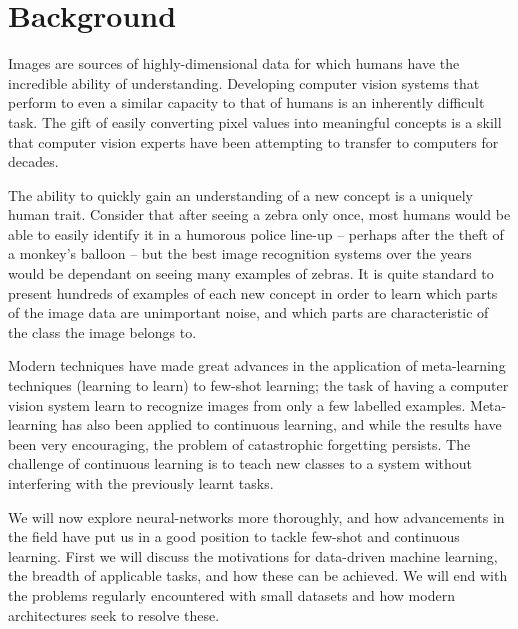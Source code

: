 \documentclass{report}
\begin{document}
\chapter{Background} \label{background:1}
Images are sources of highly-dimensional data for which humans have the incredible ability of understanding. Developing computer vision systems that perform to even a similar capacity to that of humans is an inherently difficult task. The gift of easily converting pixel values into meaningful concepts is a skill that computer vision experts have been attempting to transfer to computers for decades. \par
The ability to quickly gain an understanding of a new concept is a uniquely human trait. Consider that after seeing a zebra only once, most humans would be able to easily identify it in a humorous police line-up  -- perhaps after the theft of a monkey's balloon --  but the best image recognition systems over the years would be dependant on seeing many examples of zebras. It is quite standard to present hundreds of examples of each new concept in order to learn which parts of the image data are unimportant noise, and which parts are characteristic of the class the image belongs to. \par
Modern techniques have made great advances in the application of meta-learning techniques (learning to learn) to few-shot learning; the task of having a computer vision system learn to recognize images from only a few labelled examples. Meta-learning has also been applied to continuous learning, and while the results have been very encouraging, the problem of catastrophic forgetting persists. The challenge of continuous learning is to teach new classes to a system without interfering with the previously learnt tasks. \par
We will now explore neural-networks more thoroughly, and how advancements in the field have put us in a good position to tackle few-shot and continuous learning. First we will discuss the motivations for data-driven machine learning, the breadth of applicable tasks, and how these can be achieved. We will end with the problems regularly encountered with small datasets and how modern architectures seek to resolve these. \par
\end{document}
